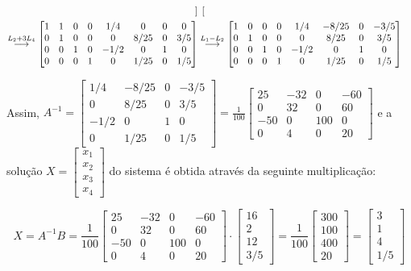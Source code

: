 \documentclass[12pt,a4paper]{article}
\newcommand{\grstep}[2][\relax]{%
   \ensuremath{\mathrel{
       {\mathop{\longrightarrow}\limits^{#2\mathstrut}_{
                                     \begin{subarray}{l} #1 \end{subarray}}}}}}
\begin{document}
\begin{enumerate}
\begin{enumerate}
\begin{align*}
\begin{bmatrix}
\end{bmatrix} \\
\grstep{ L_2 + 3L_4 }
\begin{bmatrix}
1 & 1 & 0 &  0 & 1/4 & 0 & 0 & 0 \\
0 & 1 & 0 &  0 & 0 & 8/25 & 0 & 3/5 \\
0 & 0 & 1 &  0 & -1/2 & 0 & 1 & 0 \\
0 & 0 & 0 &  1 & 0 & 1/25 & 0 & 1/5
\end{bmatrix}
&
\grstep{ L_1 - L_2 }
\begin{bmatrix}
1 & 0 & 0 &  0 & 1/4 & -8/25 & 0 & -3/5 \\
0 & 1 & 0 &  0 & 0 & 8/25 & 0 & 3/5 \\
0 & 0 & 1 &  0 & -1/2 & 0 & 1 & 0 \\
0 & 0 & 0 &  1 & 0 & 1/25 & 0 & 1/5
\end{bmatrix}
\end{align*}

Assim, $A^{-1} =
\begin{bmatrix}
 1/4 & -8/25 & 0 & -3/5 \\
   0 &  8/25 & 0 & 3/5  \\
-1/2 &     0 & 1 & 0    \\
   0 &  1/25 & 0 & 1/5
\end{bmatrix}
=
\frac{1}{100}
\begin{bmatrix}
 25 & -32 &   0 & -60 \\
  0 &  32 &   0 &  60 \\
-50 &   0 & 100 &   0 \\
  0 &   4 &   0 &  20
\end{bmatrix}$ e a solução $X = 
\begin{bmatrix}
x_1 \\
x_2 \\
x_3 \\
x_4
\end{bmatrix}$ do sistema é obtida através da seguinte multiplicação:

\[
X
= A^{-1} B
=
\frac{1}{100}
\begin{bmatrix}
 25 & -32 &   0 & -60 \\
  0 &  32 &   0 &  60 \\
-50 &   0 & 100 &   0 \\
  0 &   4 &   0 &  20
\end{bmatrix}
\cdot
\begin{bmatrix}
16 \\
 2 \\
12 \\
3/5
\end{bmatrix}
=
\frac{1}{100}
\begin{bmatrix}
300 \\
100 \\
400 \\
20
\end{bmatrix}
=
\begin{bmatrix}
3 \\
1 \\
4 \\
1/5
\end{bmatrix}
\]


\end{enumerate}
\end{enumerate}
\end{document}
